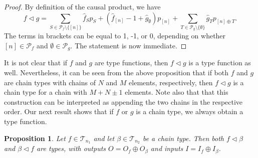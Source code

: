 \documentclass[12pt]{article}
\newtheorem{prop}{Proposition}
\theoremstyle{definition}
\theoremstyle{remark}
\def\Te{\mathcal T}
\def\Pe{\mathcal P}
\def\vtl{\vartriangleleft}
\begin{document}
\begin{proof} By definition of the causal product, we have  
\[
f\vtl g=\sum_{S\in \Pe_f\setminus\{[n]\}} \hat f_Sp_S+ (\hat f_{[n]}-1 + \hat
g_\emptyset)p_{[n]}+\sum_{T\in \Pe_g\setminus \{\emptyset\}} \hat g_T p_{[n]\oplus T}.
\]
The terms in brackets can be equal to 1, -1, or 0, depending on whether $[n]\in \Pe_f$ and
$\emptyset\in \Pe_g$. The statement is now immediate.


\end{proof}



It is not clear that if $f$ and $g$ are type functions, then $f\vtl g$ is a type function as well. 
Nevertheless, it can be seen from the above proposition
that if both $f$ and $g$ are chain types with chains of $N$ and $M$ elements,
respectively, then $f\vtl g$ is a chain type for a chain with $M+N\pm 1$
elements. Note also that that this construction can be
interpreted as appending the two chains in the respective order. 
Our next result shows that if $f$ or $g$ is a chain type, we always obtain a type
function.




\begin{prop}\label{prop:append_chain_f}  Let $f\in \Te_{n_1}$ and let $\beta\in \Te_{n_2}$
be a chain type. Then both $f\vtl \beta$ and $\beta\vtl f$ are types, with outputs
$O=O_f\oplus O_\beta$ and inputs $I=I_f\oplus I_\beta$. 

\end{prop}
\end{document}
